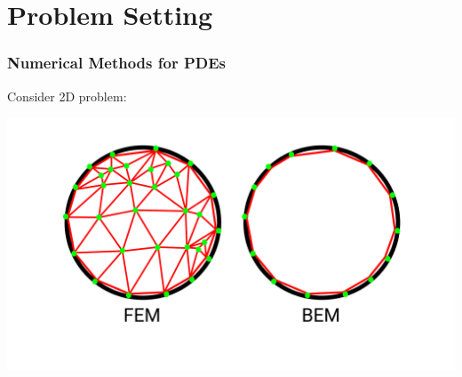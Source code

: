 \section{Problem Setting}


\begin{frame}
\frametitle{Numerical Methods for PDEs}
    Consider 2D problem:

    \includegraphics[width=\linewidth]{assets/fem_bem.pdf}
\end{frame}

